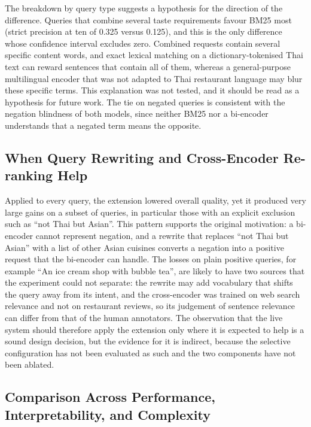 The breakdown by query type suggests a hypothesis for the direction of the difference. Queries that combine several taste requirements favour BM25 most (strict precision at ten of 0.325 versus 0.125), and this is the only difference whose confidence interval excludes zero. Combined requests contain several specific content words, and exact lexical matching on a dictionary-tokenised Thai text can reward sentences that contain all of them, whereas a general-purpose multilingual encoder that was not adapted to Thai restaurant language may blur these specific terms. This explanation was not tested, and it should be read as a hypothesis for future work. The tie on negated queries is consistent with the negation blindness of both models, since neither BM25 nor a bi-encoder understands that a negated term means the opposite.

\subsection{When Query Rewriting and Cross-Encoder Re-ranking Help}
\label{sec:discb3}

Applied to every query, the extension lowered overall quality, yet it produced very large gains on a subset of queries, in particular those with an explicit exclusion such as ``not Thai but Asian''. This pattern supports the original motivation: a bi-encoder cannot represent negation, and a rewrite that replaces ``not Thai but Asian'' with a list of other Asian cuisines converts a negation into a positive request that the bi-encoder can handle. The losses on plain positive queries, for example ``An ice cream shop with bubble tea'', are likely to have two sources that the experiment could not separate: the rewrite may add vocabulary that shifts the query away from its intent, and the cross-encoder was trained on web search relevance and not on restaurant reviews, so its judgement of sentence relevance can differ from that of the human annotators. The observation that the live system should therefore apply the extension only where it is expected to help is a sound design decision, but the evidence for it is indirect, because the selective configuration has not been evaluated as such and the two components have not been ablated.

\subsection{Comparison Across Performance, Interpretability, and Complexity}
\label{sec:disccompare}

